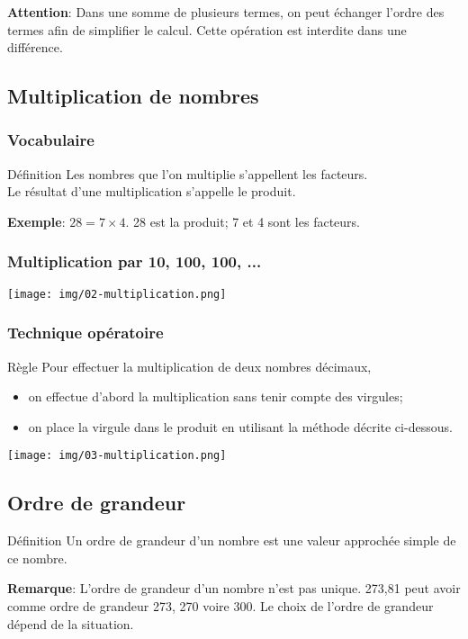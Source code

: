 \documentclass[12pt,a4paper]{article}
\begin{document}
\textbf{Attention}: Dans une somme de plusieurs termes, on peut échanger l'ordre des termes afin de simplifier le calcul. Cette opération est interdite dans une différence.

\subsection{Multiplication de nombres}
\subsubsection{Vocabulaire}
\begin{definition}{Définition}
Les nombres que l'on multiplie s'appellent les facteurs.\\
Le résultat d'une multiplication s'appelle le produit.
\end{definition}
\textbf{Exemple}: $28 = 7 \times 4$. 28 est la produit; 7 et 4 sont les facteurs.
\subsubsection{Multiplication par 10, 100, 100, ...}
\texttt{[image: img/02-multiplication.png]} 
\subsubsection{Technique opératoire}
\begin{definition}{Règle}
Pour effectuer la multiplication de deux nombres décimaux,
\begin{itemize}
\item on effectue d'abord la multiplication sans tenir compte des virgules;
\item on place la virgule dans le produit en utilisant la méthode décrite ci-dessous.
\end{itemize}
\end{definition}
\texttt{[image: img/03-multiplication.png]} 

\subsection{Ordre de grandeur}
\begin{definition}{Définition}
Un ordre de grandeur d'un nombre est une valeur approchée simple de ce nombre.
\end{definition}

\textbf{Remarque}: L'ordre de grandeur d'un nombre n'est pas unique. 273,81 peut avoir comme ordre de grandeur 273, 270 voire 300. Le choix de l'ordre de grandeur dépend de la situation.
\end{document}
